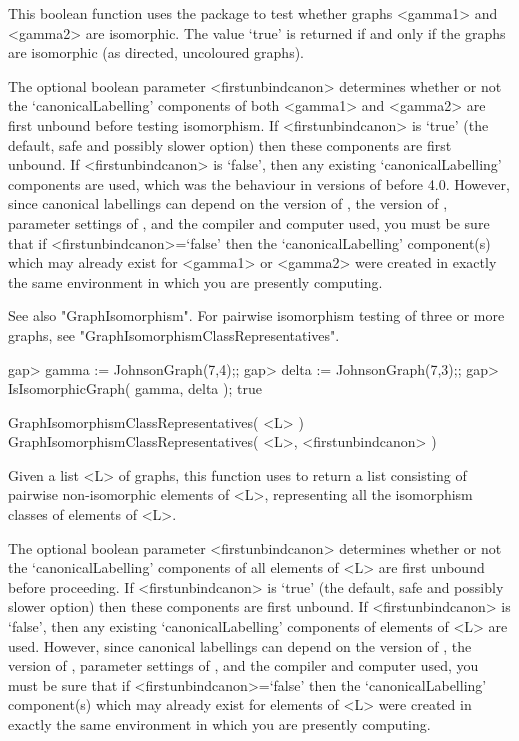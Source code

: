 This boolean function uses the {\nauty} package to test whether graphs
<gamma1> and <gamma2> are isomorphic. The value `true' is returned if
and only if the graphs are isomorphic (as directed, uncoloured
graphs).

The optional boolean parameter <firstunbindcanon> determines whether or
not the `canonicalLabelling' components of both <gamma1> and <gamma2>
are first unbound before testing isomorphism.  If <firstunbindcanon>
is `true' (the default, safe and possibly slower option) then these
components are first unbound.  If <firstunbindcanon> is `false', then any
existing `canonicalLabelling' components are used, which was the behaviour
in versions of {\GRAPE} before 4.0.  However, since canonical labellings
can depend on the version of {\nauty}, the version of {\GRAPE}, parameter
settings of {\nauty}, and the compiler and computer used, you must be
sure that if <firstunbindcanon>=`false' then the `canonicalLabelling'
component(s) which may already exist for <gamma1> or <gamma2> were created
in exactly the same environment in which you are presently computing.

See also "GraphIsomorphism".  For pairwise isomorphism testing of three
or more graphs, see "GraphIsomorphismClassRepresentatives".

\beginexample
gap> gamma := JohnsonGraph(7,4);;
gap> delta := JohnsonGraph(7,3);;
gap> IsIsomorphicGraph( gamma, delta );
true 
\endexample


\>GraphIsomorphismClassRepresentatives( <L> )
\>GraphIsomorphismClassRepresentatives( <L>, <firstunbindcanon> )

Given a list <L> of graphs, this function uses {\nauty} to return a list
consisting of pairwise non-isomorphic elements of <L>, representing all
the isomorphism classes of elements of <L>.

The optional boolean parameter <firstunbindcanon> determines whether
or not the `canonicalLabelling' components of all elements of <L>
are first unbound before proceeding.  If <firstunbindcanon> is `true'
(the default, safe and possibly slower option) then these components
are first unbound.  If <firstunbindcanon> is `false', then any existing
`canonicalLabelling' components of elements of <L> are used.  However,
since canonical labellings can depend on the version of {\nauty}, the
version of {\GRAPE}, parameter settings of {\nauty}, and the compiler
and computer used, you must be sure that if <firstunbindcanon>=`false'
then the `canonicalLabelling' component(s) which may already exist for
elements of <L> were created in exactly the same environment in which
you are presently computing.

